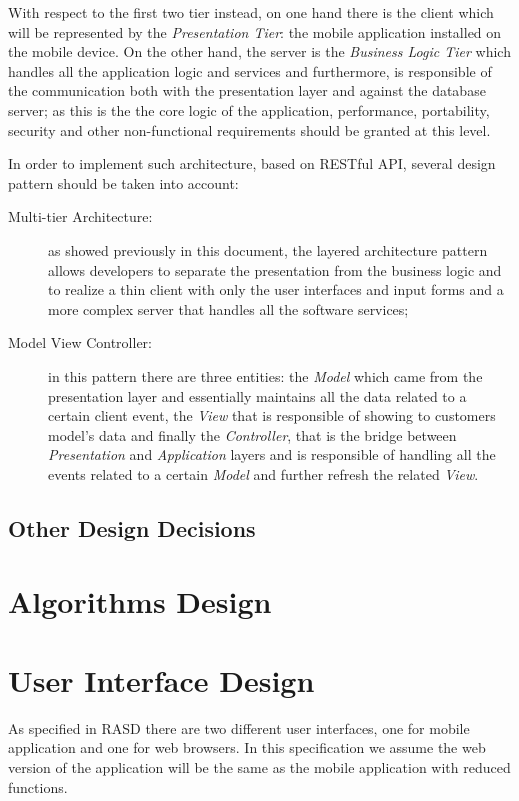 \documentclass[a4paper]{article}
\begin{document}
    With respect to the first two tier instead, on one hand there is the client which will be represented by the \textit{Presentation Tier}: the mobile application installed on the mobile device. On the other hand, the server is the \textit{Business Logic Tier} which handles all the application logic and services and furthermore, is responsible of the communication both with the presentation layer and against the database server; as this is the the core logic of the application, performance, portability, security and other non-functional requirements should be granted at this level.
    
    In order to implement such architecture, based on RESTful API, several design pattern should be taken into account:
    \begin{description}
        \item[Multi-tier Architecture:] as showed previously in this document, the layered architecture pattern allows developers to separate the presentation from the business logic and to realize a thin client with only the user interfaces and input forms and a more complex server that handles all the software services;
        \item[Model View Controller:] in this pattern there are three entities: the \textit{Model} which came from the presentation layer and essentially maintains all the data related to a certain client event, the \textit{View} that is responsible of showing to customers model's data and finally the \textit{Controller}, that is the bridge between \textit{Presentation} and \textit{Application} layers and is responsible of handling all the events related to a certain \textit{Model} and further refresh the related \textit{View}.
    \end{description}

\subsection{Other Design Decisions}

\newpage
\section{Algorithms Design}

\newpage
\section{User Interface Design}
As specified in RASD there are two different user interfaces, one for mobile application and one for web browsers. In this specification we assume the web version of the application will be the same as the mobile application with reduced functions.
\end{document}
